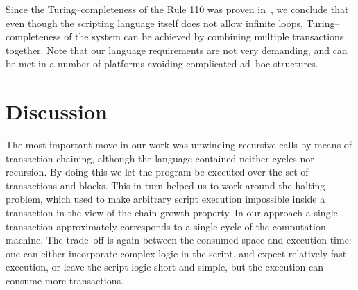\documentclass[runningheads]{llncs}
\begin{document}
    Since the Turing--completeness of the Rule 110 was proven
    in~\cite{cook2004universality}, we conclude that even though the scripting
    language itself does not allow infinite loops, Turing--completeness of the
    system can be achieved by combining multiple transactions together. Note
    that our language requirements are not very demanding, and can be met in a %
    number of platforms avoiding complicated ad--hoc structures.

    \section{Discussion}
    \label{section3}
    The most important move in our work was unwinding recursive calls by means
    of transaction chaining, although the language contained neither cycles nor
    recursion. By doing this we let the program be executed over the set of
    transactions and blocks. This in turn helped us to work around the halting
    problem, which used to make arbitrary script execution impossible inside a
    transaction in the view of the chain growth property. In our approach a single
    transaction approximately corresponds to a single cycle of the computation
    machine. The trade--off is again between the consumed space and execution
    time: one can either incorporate complex logic in the script, and expect
    relatively fast execution, or leave the script logic short and simple, but
    the execution can consume more transactions.
\end{document}
